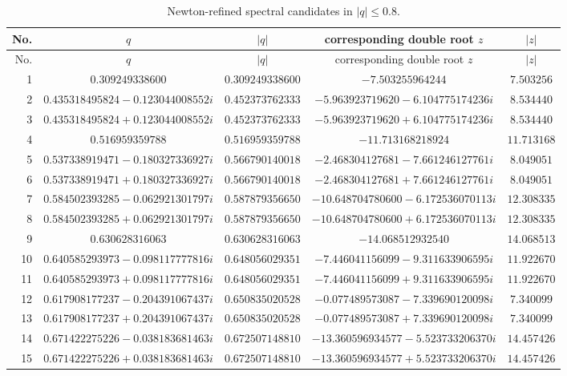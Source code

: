 \documentclass[11pt,a4paper,reqno]{amsart}
\theoremstyle{remark}
\begin{document}
{\scriptsize
\begin{longtable}{rcccc}
\caption{Newton-refined spectral candidates in $|q|\leq0.8$.}\label{tab:r08-candidates}\\
\toprule
No. & $q$ & $|q|$ & corresponding double root $z$ & $|z|$\\
\midrule
\endfirsthead
\toprule
No. & $q$ & $|q|$ & corresponding double root $z$ & $|z|$\\
\midrule
\endhead
1 & $0.309249338600$ & $0.309249338600$ & $-7.503255964244$ & $7.503256$ \\
2 & $0.435318495824-0.123044008552i$ & $0.452373762333$ & $-5.963923719620-6.104775174236i$ & $8.534440$ \\
3 & $0.435318495824+0.123044008552i$ & $0.452373762333$ & $-5.963923719620+6.104775174236i$ & $8.534440$ \\
4 & $0.516959359788$ & $0.516959359788$ & $-11.713168218924$ & $11.713168$ \\
5 & $0.537338919471-0.180327336927i$ & $0.566790140018$ & $-2.468304127681-7.661246127761i$ & $8.049051$ \\
6 & $0.537338919471+0.180327336927i$ & $0.566790140018$ & $-2.468304127681+7.661246127761i$ & $8.049051$ \\
7 & $0.584502393285-0.062921301797i$ & $0.587879356650$ & $-10.648704780600-6.172536070113i$ & $12.308335$ \\
8 & $0.584502393285+0.062921301797i$ & $0.587879356650$ & $-10.648704780600+6.172536070113i$ & $12.308335$ \\
9 & $0.630628316063$ & $0.630628316063$ & $-14.068512932540$ & $14.068513$ \\
10 & $0.640585293973-0.098117777816i$ & $0.648056029351$ & $-7.446041156099-9.311633906595i$ & $11.922670$ \\
11 & $0.640585293973+0.098117777816i$ & $0.648056029351$ & $-7.446041156099+9.311633906595i$ & $11.922670$ \\
12 & $0.617908177237-0.204391067437i$ & $0.650835020528$ & $-0.077489573087-7.339690120098i$ & $7.340099$ \\
13 & $0.617908177237+0.204391067437i$ & $0.650835020528$ & $-0.077489573087+7.339690120098i$ & $7.340099$ \\
14 & $0.671422275226-0.038183681463i$ & $0.672507148810$ & $-13.360596934577-5.523733206370i$ & $14.457426$ \\
15 & $0.671422275226+0.038183681463i$ & $0.672507148810$ & $-13.360596934577+5.523733206370i$ & $14.457426$ \\

\end{longtable}}
\end{document}

